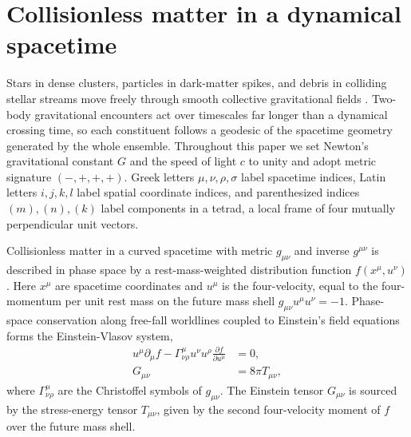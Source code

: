 \section{Collisionless matter in a dynamical spacetime}\label{sec:system}

Stars in dense clusters, particles in dark-matter spikes, and debris in colliding stellar streams move freely through smooth collective gravitational fields \cite{1985ApJ...298...34S,2008gady.book.....B,Andreasson:2011ng}. Two-body gravitational encounters act over timescales far longer than a dynamical crossing time, so each constituent follows a geodesic of the spacetime geometry generated by the whole ensemble. Throughout this paper we set Newton's gravitational constant $G$ and the speed of light $c$ to unity and adopt metric signature $(-,+,+,+)$. Greek letters $\mu,\nu,\rho,\sigma$ label spacetime indices, Latin letters $i,j,k,l$ label spatial coordinate indices, and parenthesized indices $(m),(n),(k)$ label components in a tetrad, a local frame of four mutually perpendicular unit vectors.

Collisionless matter in a curved spacetime with metric $g_{\mu\nu}$ and inverse $g^{\mu\nu}$ is described in phase space by a rest-mass-weighted distribution function $f(x^\mu, u^\nu)$ \cite{Andreasson:2011ng,Sarbach:2013fya,Acuna-Cardenas:2021nkj}. Here $x^\mu$ are spacetime coordinates and $u^\mu$ is the four-velocity, equal to the four-momentum per unit rest mass on the future mass shell $g_{\mu\nu} u^\mu u^\nu = -1$. Phase-space conservation along free-fall worldlines coupled to Einstein's field equations forms the Einstein-Vlasov system,
\begin{align}\label{eq:einstein_vlasov}
u^\mu \partial_\mu f - \Gamma^\mu_{\nu\rho} u^\nu u^\rho \frac{\partial f}{\partial u^\mu} &= 0, \nonumber\\
G_{\mu\nu} &= 8\pi T_{\mu\nu},
\end{align}
where $\Gamma^\mu_{\nu\rho}$ are the Christoffel symbols of $g_{\mu\nu}$. The Einstein tensor $G_{\mu\nu}$ is sourced by the stress-energy tensor $T_{\mu\nu}$, given by the second four-velocity moment of $f$ over the future mass shell.

